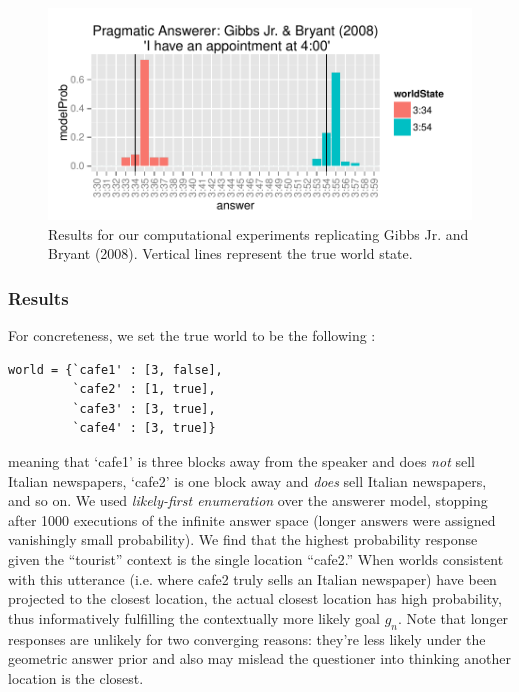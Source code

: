 \documentclass[12pt, floatsintext, jou]{apa6}
\begin{document}
 \begin{figure}[t!]
\begin{center}
\includegraphics[scale = 1]{timeExpResults.pdf}
\end{center}
\vspace{-.25cm}
\caption{Results for our computational experiments replicating Gibbs Jr. and Bryant (2008). Vertical lines represent the true world state.}
\label{fig:timeExperimentResults}
\end{figure}

\subsubsection{Results}

For concreteness, we set the true world to be the following :

\begin{lstlisting}
world = {`cafe1' : [3, false],
         `cafe2' : [1, true],
         `cafe3' : [3, true],
         `cafe4' : [3, true]}
\end{lstlisting}
meaning that `cafe1' is three blocks away from the speaker and does \emph{not} sell Italian newspapers, `cafe2' is one block away and \emph{does} sell Italian newspapers, and so on. We used \emph{likely-first enumeration} over the answerer model, stopping after 1000 executions of the infinite answer space (longer answers were assigned vanishingly small probability). We find that the highest probability response given the ``tourist'' context is the single location ``cafe2.'' When worlds consistent with this utterance (i.e. where cafe2 truly sells an Italian newspaper) have been projected to the closest location, the actual closest location has high probability, thus informatively fulfilling the contextually more likely goal $g_n$. Note that longer responses are unlikely for two converging reasons: they're less likely under the geometric answer prior and also may mislead the questioner into thinking another location is the closest. 
\end{document}
